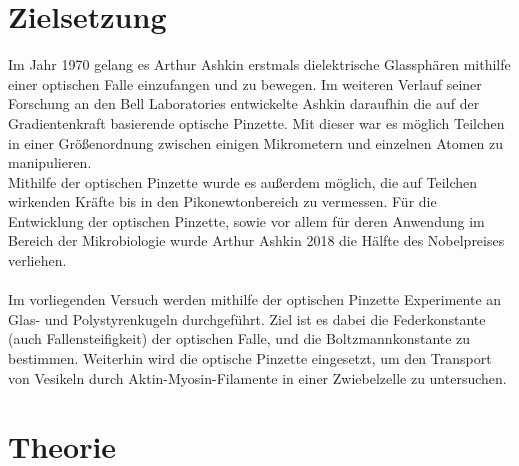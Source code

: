 \setcounter{page}{1}
\section*{Zielsetzung}
Im Jahr 1970 gelang es Arthur Ashkin erstmals dielektrische Glassphären mithilfe einer optischen Falle einzufangen und zu bewegen. \cite{Ashkin70} Im weiteren Verlauf seiner Forschung an den Bell Laboratories entwickelte Ashkin daraufhin die auf der Gradientenkraft basierende optische Pinzette.  Mit dieser war es möglich Teilchen in einer Größenordnung zwischen einigen Mikrometern und einzelnen Atomen zu manipulieren. \cite{Ashkin86}\\
Mithilfe der optischen Pinzette wurde es außerdem möglich, die auf Teilchen wirkenden Kräfte bis in den Pikonewtonbereich zu vermessen. Für die Entwicklung der optischen Pinzette, sowie vor allem für deren Anwendung im Bereich der Mikrobiologie wurde Arthur Ashkin 2018 die Hälfte des Nobelpreises verliehen. \cite{nobel}\\
\\
Im vorliegenden Versuch werden mithilfe der optischen Pinzette Experimente an Glas- und Polystyrenkugeln durchgeführt. Ziel ist es dabei die Federkonstante (auch Fallensteifigkeit) der optischen Falle, und die Boltzmannkonstante zu bestimmen. Weiterhin wird die optische Pinzette eingesetzt, um den Transport von Vesikeln durch Aktin-Myosin-Filamente in einer Zwiebelzelle zu untersuchen.\\

\section{Theorie}
